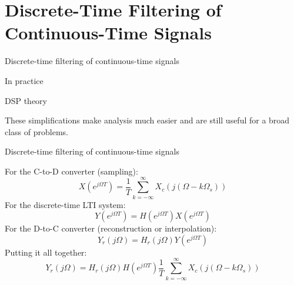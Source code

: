 \documentclass[10pt]{beamer}
\begin{document}
\section{Discrete-Time Filtering of Continuous-Time Signals}
\begin{frame}{Discrete-time filtering of continuous-time signals}
	\begin{block}{In practice}
		\begin{center}
			\resizebox{\linewidth}{!}{}
		\end{center}
	\end{block}

	\begin{block}{DSP theory}
		\begin{center}
			\resizebox{\linewidth}{!}{}
		\end{center}
	These simplifications make analysis much easier and are still useful for a broad class of problems.
	\end{block}
\end{frame}

\begin{frame}{Discrete-time filtering of continuous-time signals}
	\vspace{-0.5cm}
	\begin{center}
		\resizebox{\linewidth}{!}{}
	\end{center}
	\pause
	For the C-to-D converter (sampling):
	\begin{equation*}
		X(e^{j\Omega T}) = \frac{1}{T}\sum_{k=-\infty}^{\infty}X_c(j(\Omega - k\Omega_s))
	\end{equation*}
	\pause
	For the discrete-time LTI system:
	\begin{equation*}
	Y(e^{j\Omega T}) = H(e^{j\Omega T})X(e^{j\Omega T}) \tag{using $\omega = \Omega T$}
	\end{equation*}
	\pause
	For the D-to-C converter (reconstruction or interpolation):
	\begin{equation*}
	Y_r(j\Omega) = H_r(j\Omega)Y(e^{j\Omega T})
	\end{equation*}
	\pause
	Putting it all together:
	\begin{equation*}
		Y_r(j\Omega) = H_r(j\Omega)H(e^{j\Omega T})\frac{1}{T}\sum_{k=-\infty}^{\infty}X_c(j(\Omega - k\Omega_s))
	\end{equation*}
\end{frame}
\end{document}
